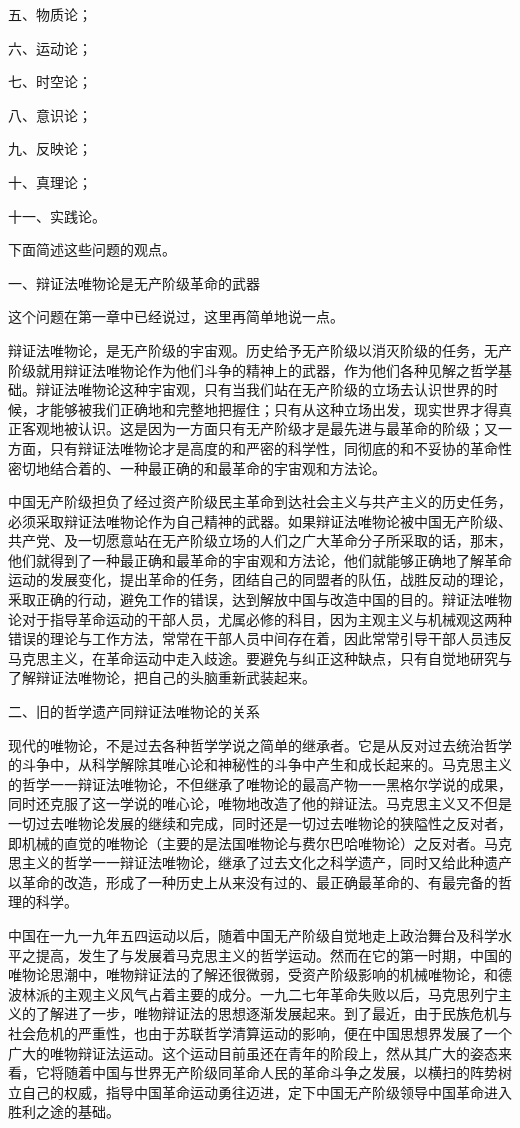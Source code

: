 五、物质论；

六、运动论；

七、时空论；

八、意识论；

九、反映论；

十、真理论；

十一、实践论。

下面简述这些问题的观点。

一、辩证法唯物论是无产阶级革命的武器

这个问题在第一章中已经说过，这里再简单地说一点。

辩证法唯物论，是无产阶级的宇宙观。历史给予无产阶级以消灭阶级的任务，无产阶级就用辩证法唯物论作为他们斗争的精神上的武器，作为他们各种见解之哲学基础。辩证法唯物论这种宇宙观，只有当我们站在无产阶级的立场去认识世界的时候，才能够被我们正确地和完整地把握住；只有从这种立场出发，现实世界才得真正客观地被认识。这是因为一方面只有无产阶级才是最先进与最革命的阶级；又一方面，只有辩证法唯物论才是高度的和严密的科学性，同彻底的和不妥协的革命性密切地结合着的、一种最正确的和最革命的宇宙观和方法论。

中国无产阶级担负了经过资产阶级民主革命到达社会主义与共产主义的历史任务，必须采取辩证法唯物论作为自己精神的武器。如果辩证法唯物论被中国无产阶级、共产党、及一切愿意站在无产阶级立场的人们之广大革命分子所采取的话，那末，他们就得到了一种最正确和最革命的宇宙观和方法论，他们就能够正确地了解革命运动的发展变化，提出革命的任务，团结自己的同盟者的队伍，战胜反动的理论，釆取正确的行动，避免工作的错误，达到解放中国与改造中国的目的。辩证法唯物论对于指导革命运动的干部人员，尤属必修的科目，因为主观主义与机械观这两种错误的理论与工作方法，常常在干部人员中间存在着，因此常常引导干部人员违反马克思主义，在革命运动中走入歧途。要避免与纠正这种缺点，只有自觉地研究与了解辩证法唯物论，把自己的头脑重新武装起来。

二、旧的哲学遗产同辩证法唯物论的关系

现代的唯物论，不是过去各种哲学学说之简单的继承者。它是从反对过去统治哲学的斗争中，从科学解除其唯心论和神秘性的斗争中产生和成长起来的。马克思主义的哲学一一辩证法唯物论，不但继承了唯物论的最高产物一一黑格尔学说的成果，同时还克服了这一学说的唯心论，唯物地改造了他的辩证法。马克思主义又不但是一切过去唯物论发展的继续和完成，同时还是一切过去唯物论的狭隘性之反对者，即机械的直觉的唯物论（主要的是法国唯物论与费尔巴哈唯物论）之反对者。马克思主义的哲学一一辩证法唯物论，继承了过去文化之科学遗产，同时又给此种遗产以革命的改造，形成了一种历史上从来没有过的、最正确最革命的、有最完备的哲理的科学。

中国在一九一九年五四运动以后，随着中国无产阶级自觉地走上政治舞台及科学水平之提高，发生了与发展着马克思主义的哲学运动。然而在它的第一时期，中国的唯物论思潮中，唯物辩证法的了解还很微弱，受资产阶级影响的机械唯物论，和德波林派的主观主义风气占着主要的成分。一九二七年革命失败以后，马克思列宁主义的了解进了一步，唯物辩证法的思想逐渐发展起来。到了最近，由于民族危机与社会危机的严重性，也由于苏联哲学清算运动的影响，便在中国思想界发展了一个广大的唯物辩证法运动。这个运动目前虽还在青年的阶段上，然从其广大的姿态来看，它将随着中国与世界无产阶级同革命人民的革命斗争之发展，以横扫的阵势树立自己的权威，指导中国革命运动勇往迈进，定下中国无产阶级领导中国革命进入胜利之途的基础。

